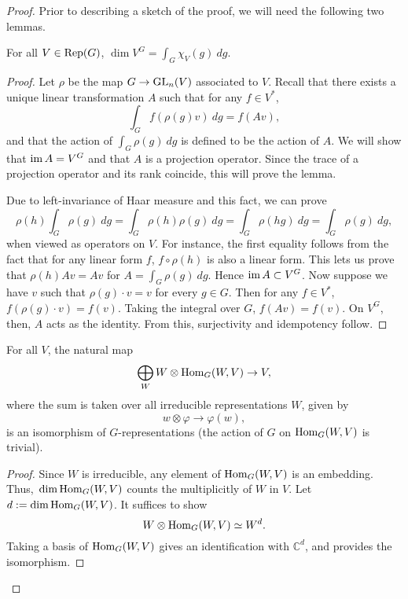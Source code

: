 \begin{proof}
Prior to describing a sketch of the proof, we will need the following two
lemmas.

\begin{lem}\label{dims}
For all $V \in \mathrm{Rep}(G)$, $\dim V^G = \displaystyle\int_G \chi_V(g) \ dg$.
\end{lem}

\begin{proof}
Let $\rho$ be the map $G \rightarrow \operatorname{GL}_n(V)$ associated to $V$. Recall
that there exists a unique linear transformation $A$ such that for any
$f \in V^*$, \[ \int_G f(\rho(g) v) \ dg = f(Av), \] and that the action of
$\int_G \rho(g) \ dg$ is defined to be the action of $A$. We will show that
$\operatorname{im} A = V^G$ and that $A$ is a projection operator. Since the trace of
a projection operator and its rank coincide, this will prove the lemma.

Due to left-invariance of Haar measure and this fact, we can prove
\[\rho(h) \int_G \rho(g) \ dg = \int_G \rho(h) \rho(g) \ dg
    = \int_G \rho(hg) \ dg = \int_G \rho(g) \ dg,\]
when viewed as operators on $V$. For instance, the first equality follows from
the fact that for any linear form $f$, $f \circ \rho(h)$ is also a linear form.
This lets us prove that $\rho(h) Av = Av$ for $A = \int_G \rho(g) \ dg$. Hence
$\operatorname{im} A \subset V^G$. Now suppose we have $v$ such that $\rho(g) \cdot v = v$
for every $g \in G$. Then for any $f \in V^*$, $f(\rho(g) \cdot v) = f(v)$.
Taking the integral over $G$, $f(Av) = f(v)$. On $V^G$, then, $A$ acts as
the identity. From this, surjectivity and idempotency follow.
\end{proof}

\begin{lem}\label{b}
For all $V$, the natural map
\[ \bigoplus_{W} W \otimes \operatorname{Hom}_G(W, V) \rightarrow V, \]
where the sum is taken over all irreducible representations $W$, given by
\[ w \otimes \varphi \rightarrow \varphi(w), \]
is an isomorphism of $G$-representations (the action of $G$ on
$\operatorname{Hom}_G(W, V)$ is trivial).
\end{lem}

\begin{proof}
Since $W$ is irreducible, any element of $\operatorname{Hom}_G(W, V)$ is an embedding.
Thus, $\newline\dim \op{Hom}_G(W, V)$ counts the multiplicitly of $W$ in $V$. 
Let $d := \dim \operatorname{Hom}_G(W, V)$. It suffices to show
\[ W \otimes \operatorname{Hom}_G(W, V) \simeq W^d. \] Taking a basis of
$\operatorname{Hom}_G(W, V)$ gives an identification with $\mathbb{C}^d$, and provides the
isomorphism.
\end{proof}


\end{proof}
